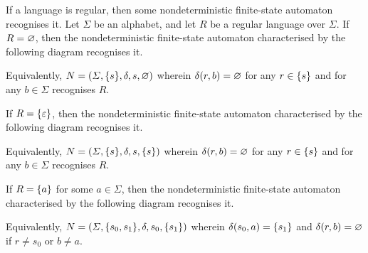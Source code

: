 \Blm
    \label{lem1}
    If a language is regular, then some nondeterministic finite-state automaton
    recognises it.
\Elm
\Bpr
    Let \(\varSigma\) be an alphabet, and let \(R\) be a regular language over
    \(\varSigma\). If \(R = \varnothing\), then the nondeterministic finite-state
    automaton characterised by the following diagram recognises it.
    \begin{figure}[!h]
        \centering
    \end{figure}

    \noindent Equivalently, \(N = (\varSigma, \{s\}, \delta, s, \varnothing)\)
    wherein \(\delta(r, b) = \varnothing\) for any \(r \in \{s\}\) and for any \(b
    \in \varSigma\) recognises \(R\).

    If \(R = \{\varepsilon\}\), then the nondeterministic finite-state
    automaton characterised by the following diagram recognises it.
    \begin{figure}[!h]
        \centering
    \end{figure}

    \noindent Equivalently, \(N = (\varSigma, \{s\}, \delta, s, \{s\})\)
    wherein \(\delta(r, b) = \varnothing\) for any \(r \in \{s\}\) and for any \(b
    \in \varSigma\) recognises \(R\).

    If \(R = \{a\}\) for some \(a \in \varSigma\), then the nondeterministic
    finite-state automaton characterised by the following diagram recognises it.
    \begin{figure}[!h]
        \centering
    \end{figure}

    \noindent Equivalently, \(N = (\varSigma, \{s_0, s_1\}, \delta, s_0,
    \{s_1\})\) wherein \(\delta(s_0, a) = \{s_1\}\) and \(\delta(r, b) =
    \varnothing\) if \(r \neq s_0\) or \(b \neq a\).

